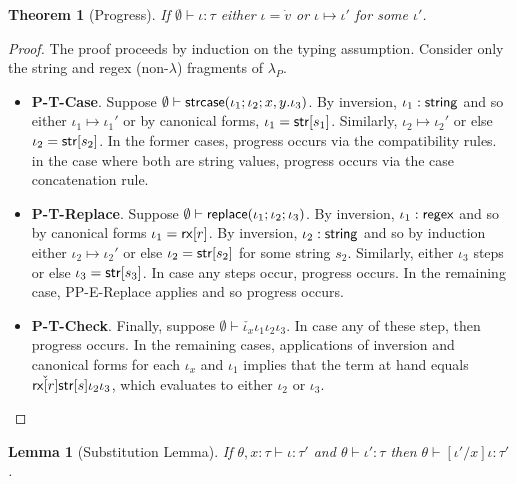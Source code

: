 \documentclass[11pt,leqno]{article}
\newtheorem{trlem}[tr]{Lemma}
\newtheorem{thm}{Theorem}
\theoremstyle{definition}
\newcommand{\lambdap}{\lambda_P}
\renewcommand{\tstr}[1]{{{\sf str}[#1]}}
\newcommand{\preplace}[3]{{\sf replace}(#1;#2;#3)}
\newcommand{\rx}[1]{ {\sf rx}[#1] }
\newcommand{\str}{{\sf string}}
\newcommand{\regex}{{\sf regex}}
\newcommand{\pstrcase}[3]{ {\sf strcase}(#1; #2; #3)}
\begin{document}
\begin{thm}[Progress]
If $\emptyset\vdash \iota : \tau$ either $\iota = \dot{v}$ or $\iota \mapsto \iota'$ for some $\iota'$.
\end{thm}
\begin{proof}
The proof proceeds by induction on the typing assumption. 
Consider only the string and regex (non-$\lambda$) fragments of $\lambdap$.
\begin{itemize}[label=$ $,itemsep=1ex]

\item \textbf{P-T-Case}.
Suppose $\emptyset \vdash \pstrcase{\iota_1}{\iota_2}{x,y.\iota_3}$.
By inversion, $\iota_1 : \str$ and so either $\iota_1 \mapsto \iota_1'$
or by canonical forms, $\iota_1 = \tstr{s_1}$.
Similarly, $\iota_2 \mapsto \iota_2'$ or else $\iota_2 = \tstr{s_2}$.
In the former cases, progress occurs via the compatibility rules.
in the case where both are string values, progress occurs via the case concatenation rule.

\item \textbf{P-T-Replace}.
Suppose $\emptyset \vdash \preplace{\iota_1}{\iota_2}{\iota_3}$.
By inversion, $\iota_1 : \regex$ and so by canonical forms $\iota_1 = \rx{r}$.
By inversion, $\iota_2 : \str$ and so by induction either $\iota_2 \mapsto \iota_2'$
or else $\iota_2 = \tstr{s_2}$ for some string $s_2$.
Similarly, either $\iota_3$ steps or else $\iota_3 = \tstr{s_3}$.
In case any steps occur, progress occurs. In the remaining case,
PP-E-Replace applies and so progress occurs.

\item \textbf{P-T-Check}.
Finally, suppose $\emptyset \vdash \check{\iota_x}{\iota_1}{\iota_2}{\iota_3}$.
In case any of these step, then progress occurs.
In the remaining cases, applications of inversion and canonical forms for each
$\iota_x$ and $\iota_1$ implies that the term at hand equals $\check{\rx{r}}{\tstr{s}}{\iota_2}{\iota_3}$,
which evaluates to either $\iota_2$ or $\iota_3$.

\end{itemize}
\end{proof}

\begin{trlem}[Substitution Lemma] \label{lem:psubst}
If $\theta, x : \tau \vdash \iota : \tau'$ and $\theta \vdash \iota' : \tau$
then $\theta \vdash [\iota' / x]\iota : \tau'$.
\end{trlem}
\end{document}
